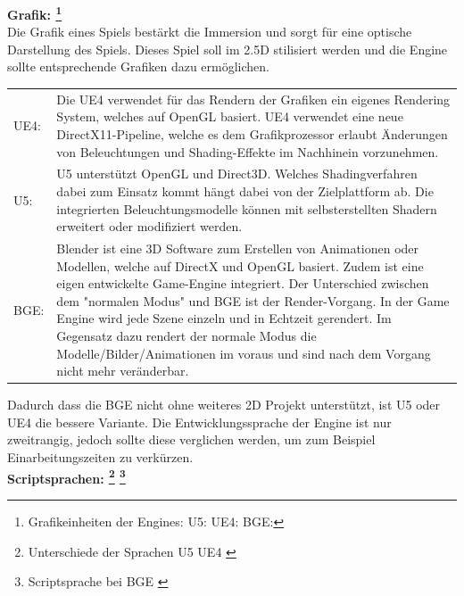\textbf{Grafik: \footnote{Grafikeinheiten der Engines: U5:\cite{unitytechnologies2015graphics} UE4:\cite{epicgamesinc.20152d} \cite{epicgamesinc.2015graphics} BGE:\cite{blender.org2015engine}}}\\
Die Grafik eines Spiels bestärkt die Immersion und sorgt für eine optische Darstellung des Spiels. Dieses Spiel soll im 2.5D stilisiert werden und die Engine sollte entsprechende Grafiken dazu ermöglichen.
\begin{table}[H]
\centering
\begin{tabular}{lp{14.5cm}}

\ac{UE4}:&
Die \ac{UE4} verwendet für das Rendern der Grafiken ein eigenes Rendering System, welches auf OpenGL basiert. \ac{UE4} verwendet eine neue DirectX11-Pipeline, welche es dem Grafikprozessor erlaubt Änderungen von Beleuchtungen und Shading-Effekte im Nachhinein vorzunehmen.\\
\ac{U5}: &
\ac{U5} unterstützt OpenGL und Direct3D. Welches Shadingverfahren dabei zum Einsatz kommt hängt dabei von der  Zielplattform ab. Die integrierten Beleuchtungsmodelle können mit selbsterstellten Shadern erweitert oder modifiziert werden.\\
\ac{BGE}:&
Blender ist eine 3D Software zum Erstellen von Animationen oder Modellen, welche auf DirectX und OpenGL basiert. Zudem ist eine eigen entwickelte Game-Engine integriert. Der Unterschied zwischen dem "normalen Modus" und \ac{BGE} ist der Render-Vorgang. In der Game Engine wird jede Szene einzeln und in Echtzeit gerendert. Im Gegensatz dazu rendert der normale Modus die Modelle/Bilder/Animationen im voraus und sind nach dem Vorgang nicht mehr veränderbar.
\end{tabular}
\end{table}
Dadurch dass die \ac{BGE} nicht ohne weiteres 2D Projekt unterstützt, ist \ac{U5} oder \ac{UE4} die bessere Variante.
Die Entwicklungssprache der Engine ist nur zweitrangig, jedoch sollte diese verglichen werden, um zum Beispiel Einarbeitungszeiten zu verkürzen.\\
\newpage
\textbf{Scriptsprachen: \footnote{ Unterschiede der Sprachen U5 UE4 \cite{unityhacker2015}} \footnote{Scriptsprache bei BGE \cite{ blender.org2015engine}}}
